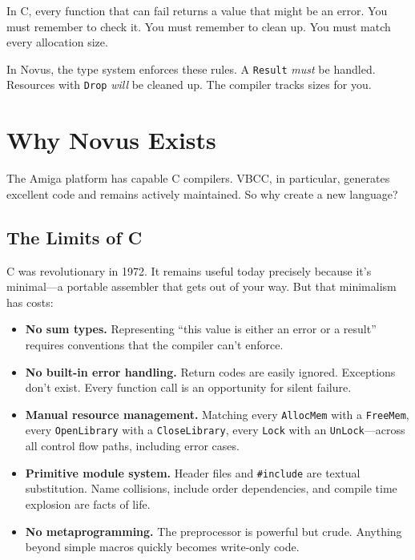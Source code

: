 \begin{comingfromc}
In C, every function that can fail returns a value that might be an error. You must remember to check it. You must remember to clean up. You must match every allocation size.

In Novus, the type system enforces these rules. A \texttt{Result} \emph{must} be handled. Resources with \texttt{Drop} \emph{will} be cleaned up. The compiler tracks sizes for you.
\end{comingfromc}

\section{Why Novus Exists}

The Amiga platform has capable C compilers. VBCC, in particular, generates excellent code and remains actively maintained. So why create a new language?

\subsection{The Limits of C}

C was revolutionary in 1972. It remains useful today precisely because it's minimal---a portable assembler that gets out of your way. But that minimalism has costs:

\begin{itemize}
    \item \textbf{No sum types.} Representing ``this value is either an error or a result'' requires conventions that the compiler can't enforce.

    \item \textbf{No built-in error handling.} Return codes are easily ignored. Exceptions don't exist. Every function call is an opportunity for silent failure.

    \item \textbf{Manual resource management.} Matching every \texttt{AllocMem} with a \texttt{FreeMem}, every \texttt{OpenLibrary} with a \texttt{CloseLibrary}, every \texttt{Lock} with an \texttt{UnLock}---across all control flow paths, including error cases.

    \item \textbf{Primitive module system.} Header files and \texttt{\#include} are textual substitution. Name collisions, include order dependencies, and compile time explosion are facts of life.

    \item \textbf{No metaprogramming.} The preprocessor is powerful but crude. Anything beyond simple macros quickly becomes write-only code.
\end{itemize}

